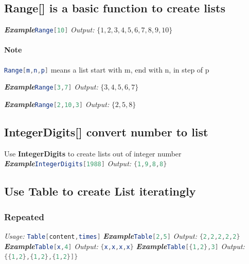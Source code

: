\documentclass[10pt]{book}
\begin{document}
\subsection{Range[] is a basic function to create lists}

\noindent\emph{\textbf{Example}}\quad \lstinline[language=Mathematica]|Range[10]| \hspace{\fill}\emph{Output:} $\{1,2,3,4,5,6,7,8,9,10\}$

\paragraph{Note}\lstinline[language=Mathematica]|Range[m,n,p]| means a list start with m, end with n, in step of p

\noindent\emph{\textbf{Example}}\quad \lstinline[language=Mathematica]|Range[3,7]| \hspace{\fill}\emph{Output:} $\{3,4,5,6,7\}$

\noindent\emph{\textbf{Example}}\quad \lstinline[language=Mathematica]|Range[2,10,3]| \hspace{\fill}\emph{Output:} $\{2,5,8\}$

\subsection{IntegerDigits[] convert number to list}
\noindent Use \textbf{IntegerDigits} to create lists out of integer number
\newline
\noindent\emph{\textbf{Example}}\quad \lstinline[language=Mathematica]|IntegerDigits[1988]| \hspace{\fill}\emph{Output:} \lstinline[language=Mathematica]|{1,9,8,8}|

\subsection{Use Table to create List iteratingly}
\label{subsec:label}

\subsubsection{Repeated}
\emph{Usage:} \lstinline[language=Mathematica]|Table[content,times]| 
\newline
\noindent\emph{\textbf{Example}}\quad \lstinline[language=Mathematica]|Table[2,5]| \hspace{\fill}\emph{Output:} \lstinline[language=Mathematica]|{2,2,2,2,2}|
\newline
\noindent\emph{\textbf{Example}}\quad \lstinline[language=Mathematica]|Table[x,4]| \hspace{\fill}\emph{Output:} \lstinline[language=Mathematica]|{x,x,x,x}|
\newline
\noindent\emph{\textbf{Example}}\quad \lstinline[language=Mathematica]|Table[{1,2},3]| \hspace{\fill}\emph{Output:} \lstinline[language=Mathematica]|{{1,2},{1,2},{1,2}]}|
\newline
\end{document}
